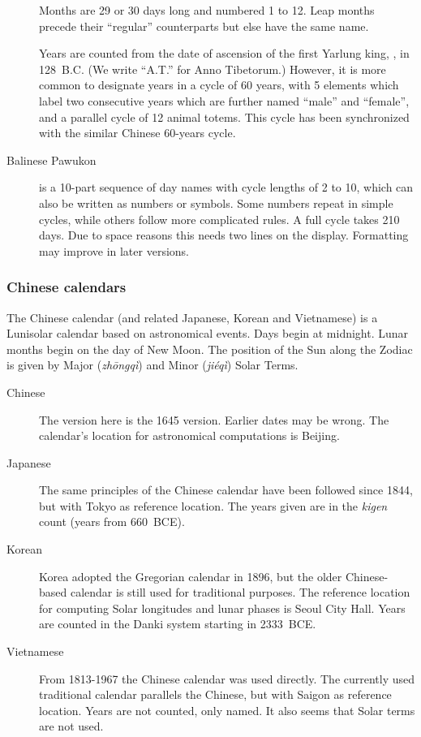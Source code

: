 \begin{description}
  Months are 29 or 30 days long and numbered 1 to 12. Leap months
  precede their ``regular'' counterparts but else have the same name.

  Years are counted from the date of ascension of the first Yarlung
  king, , in 128~B.C. (We write ``A.T.'' for Anno
  Tibetorum.) However, it is more common to designate years in a cycle
  of 60 years, with 5 elements which label two consecutive years which
  are further named ``male'' and ``female'', and a parallel cycle of
  12 animal totems. This cycle has been synchronized with the similar
  Chinese 60-years cycle.
  
\item[Balinese Pawukon] is a 10-part sequence of day names with cycle
  lengths of 2 to 10, which can also be written as numbers or
  symbols. Some numbers repeat in simple cycles, while others follow
  more complicated rules. A full cycle takes 210 days.  Due to space
  reasons this needs two lines on the display. Formatting may improve
  in later versions.
\end{description}

\subsubsection{Chinese calendars}
The Chinese calendar (and related Japanese, Korean and Vietnamese)
is a Lunisolar calendar based on astronomical events.
Days begin at midnight. Lunar months begin on the day of New Moon.
The position of the Sun along the Zodiac is given by Major (\emph{zh\={o}ngqì})
and Minor (\emph{jiéqì}) Solar Terms.

\begin{description}
\item[Chinese] The version here is the 1645 version. Earlier dates may be wrong.
  The calendar's location for astronomical computations is Beijing.
\item[Japanese] The same principles of the Chinese calendar have been
  followed since 1844, but with Tokyo as reference location. The years
  given are in the \emph{kigen} count (years from 660~BCE).
\item[Korean] Korea adopted the Gregorian calendar in 1896, but the
  older Chinese-based calendar is still used for traditional
  purposes. The reference location for computing Solar longitudes and
  lunar phases is Seoul City Hall. Years are counted in the Danki
  system starting in 2333~BCE.
\item[Vietnamese] From 1813-1967 the Chinese calendar was used
  directly. The currently used traditional calendar parallels the
  Chinese, but with Saigon as reference location. Years are not counted, only named.
  It also seems that Solar terms are not used.
\end{description}

